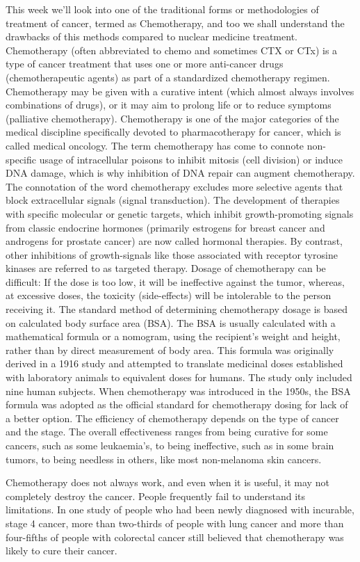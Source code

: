 \documentclass[
]{article}
\begin{document}
This week we'll look into one of the traditional forms or methodologies
of treatment of cancer, termed as Chemotherapy, and too we shall
understand the drawbacks of this methods compared to nuclear medicine
treatment. Chemotherapy (often abbreviated to chemo and sometimes CTX or
CTx) is a type of cancer treatment that uses one or more anti-cancer
drugs (chemotherapeutic agents) as part of a standardized chemotherapy
regimen. Chemotherapy may be given with a curative intent (which almost
always involves combinations of drugs), or it may aim to prolong life or
to reduce symptoms (palliative chemotherapy). Chemotherapy is one of the
major categories of the medical discipline specifically devoted to
pharmacotherapy for cancer, which is called medical oncology. The term
chemotherapy has come to connote non-specific usage of intracellular
poisons to inhibit mitosis (cell division) or induce DNA damage, which
is why inhibition of DNA repair can augment chemotherapy. The
connotation of the word chemotherapy excludes more selective agents that
block extracellular signals (signal transduction). The development of
therapies with specific molecular or genetic targets, which inhibit
growth-promoting signals from classic endocrine hormones (primarily
estrogens for breast cancer and androgens for prostate cancer) are now
called hormonal therapies. By contrast, other inhibitions of
growth-signals like those associated with receptor tyrosine kinases are
referred to as targeted therapy. Dosage of chemotherapy can be
difficult: If the dose is too low, it will be ineffective against the
tumor, whereas, at excessive doses, the toxicity (side-effects) will be
intolerable to the person receiving it. The standard method of
determining chemotherapy dosage is based on calculated body surface area
(BSA). The BSA is usually calculated with a mathematical formula or a
nomogram, using the recipient's weight and height, rather than by direct
measurement of body area. This formula was originally derived in a 1916
study and attempted to translate medicinal doses established with
laboratory animals to equivalent doses for humans. The study only
included nine human subjects. When chemotherapy was introduced in the
1950s, the BSA formula was adopted as the official standard for
chemotherapy dosing for lack of a better option. The efficiency of
chemotherapy depends on the type of cancer and the stage. The overall
effectiveness ranges from being curative for some cancers, such as some
leukaemia's, to being ineffective, such as in some brain tumors, to
being needless in others, like most non-melanoma skin cancers.

Chemotherapy does not always work, and even when it is useful, it may
not completely destroy the cancer. People frequently fail to understand
its limitations. In one study of people who had been newly diagnosed
with incurable, stage 4 cancer, more than two-thirds of people with lung
cancer and more than four-fifths of people with colorectal cancer still
believed that chemotherapy was likely to cure their cancer.
\end{document}
